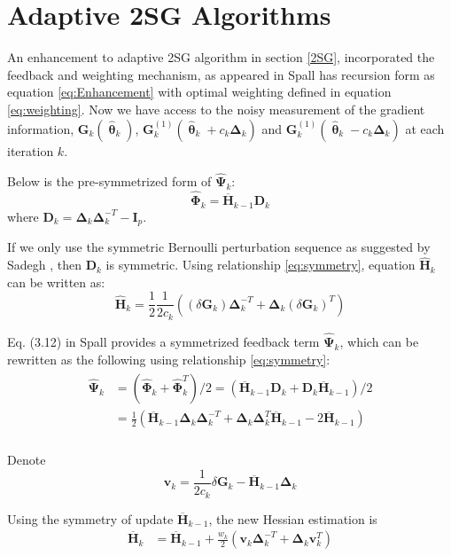 \documentclass[conference]{IEEEtran}
\newcommand{\bD}{\bm{D}}
\newcommand{\bG}{\bm{G}}
\newcommand{\bI}{\bm{I}}
\newcommand{\bDelta}{\bm{\Delta}}
\newcommand{\oH}{\bm{\overline{H}}}
\newcommand{\hH}{\bm{\hat{H}}}
\newcommand{\hPsi}{\bm{\hat{\Psi}}}
\newcommand{\htheta}{\bm{\hat{\uptheta}}}
\newcommand{\hPhi}{\bm{\hat{\Phi}}}
\begin{document}
\section{Adaptive 2SG Algorithms} \label{Enhanced 2SG}
An enhancement to adaptive 2SG algorithm in section \ref{2SG}, incorporated the feedback and weighting mechanism, as appeared in Spall \cite{Spall2009} has recursion form as equation \ref{eq:Enhancement} with optimal weighting defined in equation \ref{eq:weighting}. Now we have access to the noisy measurement of the gradient information, $\bG_k(\htheta_k)$, $\bG_k^{(1)}(\htheta_k+ c_k\bDelta_k)$ and $\bG_k^{(1)}(\htheta_k- c_k\bDelta_k)$ at each iteration $k$.

Below is the pre-symmetrized form of $ \hPsi_k $:
\begin{equation}
\hPhi_k=\oH_{k-1}\bD_k
\end{equation}
where $ \bD_k=\bDelta_k\bDelta_k^{-T}-\bI_p$.

If we only use the symmetric Bernoulli perturbation sequence as
suggested by Sadegh \cite{Sadegh1998}, then $\bD_k$ is
symmetric. Using relationship \ref{eq:symmetry}, equation
$\hH_k$ can be written as:
\begin{equation}
\hH_k=\frac{1}{2}\frac{1}{2c_k}\left( (\delta\bG_k)\bDelta_k^{-T}+\bDelta_k(\delta\bG_k)^{T} \right)
\end{equation}

Eq. (3.12) in Spall \cite{Spall2009} provides a symmetrized feedback term $ \hPsi_k $, which can be rewritten as the following using relationship \ref{eq:symmetry}:
\begin{align}
\begin{split}
\hPsi_k &=(\hPhi_k+\hPhi_k^T)/2=(\oH_{k-1}\bD_k+\bD_k\oH_{k-1})/2\\
&=\frac{1}{2}\left( \oH_{k-1}\bDelta_k\bDelta_k^{-T}+\bDelta_k\bDelta_k^{T}\oH_{k-1}-2\oH_{k-1} \right)\\
\end{split}
\end{align}

Denote
\begin{equation}
\bm{v}_k= \frac{1}{2c_k}\delta\bG_k-\oH_{k-1}\bDelta_k
\end{equation}


Using the symmetry of update $\oH_{k-1}$, the new Hessian estimation is
\begin{align*}
\oH_k&=\oH_{k-1}+\frac{w_k}{2} (\bm{v}_k\bDelta_k^{-T}+\bDelta_k\bm{v}_k^{T})
\end{align*}
\end{document}
